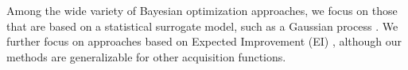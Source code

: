 \documentclass{article}
\begin{document}

%
%
%
%
%
%

Among the wide variety of Bayesian optimization approaches, we focus
on those that are based on a statistical surrogate model, such as a
Gaussian process
\citep{santnerBook}. We further focus on approaches based on Expected
Improvement (EI) \citep{gBook}, although our methods are
generalizable for other acquisition functions. 

%
%
\end{document}
